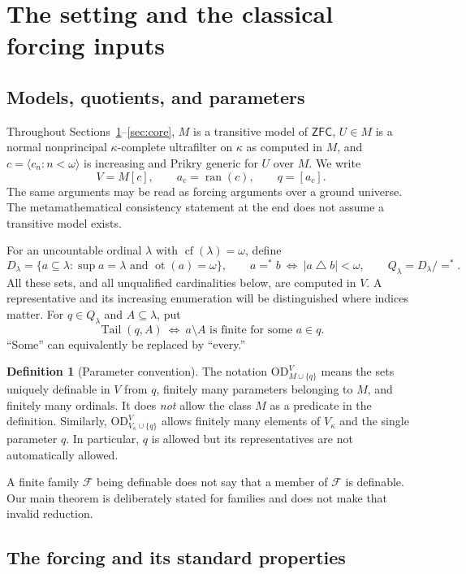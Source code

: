 \documentclass[11pt,letterpaper]{article}
\theoremstyle{definition}
\newtheorem{definition}{Definition}[section]
\numberwithin{equation}{section}
\newcommand{\ZFC}{\mathsf{ZFC}}
\newcommand{\OD}{\mathrm{OD}}
\newcommand{\cf}{\operatorname{cf}}
\newcommand{\ot}{\operatorname{ot}}
\newcommand{\ran}{\operatorname{ran}}
\newcommand{\ODg}{\OD_{M\cup\{q\}}^{V}}
\newcommand{\ODlow}{\OD_{V_\kappa\cup\{q\}}^{V}}
\newcommand{\tail}{\operatorname{Tail}}
\newcommand{\cseq}{\langle c_n:n<\omega\rangle}
\begin{document}
\section{The setting and the classical forcing inputs}\label{sec:setting}

\subsection{Models, quotients, and parameters}

Throughout Sections~\ref{sec:setting}--\ref{sec:core}, $M$ is a transitive
model of $\ZFC$, $U\in M$ is a normal nonprincipal $\kappa$-complete
ultrafilter on $\kappa$ as computed in $M$, and $c=\cseq$ is increasing and
Prikry generic for $U$ over $M$. We write
\[
 V=M[c],\qquad a_c=\ran(c),\qquad q=[a_c].
\]
The same arguments may be read as forcing arguments over a ground universe.
The metamathematical consistency statement at the end does not assume a
transitive model exists.

For an uncountable ordinal $\lambda$ with $\cf(\lambda)=\omega$, define
\[
 D_\lambda=\{a\subseteq\lambda:\sup a=\lambda\text{ and }\ot(a)=\omega\},
 \qquad
 a=^*b\ \Longleftrightarrow\ |a\mathbin\triangle b|<\omega,
 \qquad Q_\lambda=D_\lambda/=^*.
\]
All these sets, and all unqualified cardinalities below, are computed in
$V$. A representative and its increasing enumeration will be distinguished
where indices matter. For $q\in Q_\lambda$ and $A\subseteq\lambda$, put
\[
 \tail(q,A)\ \Longleftrightarrow\ a\setminus A\text{ is finite for some }a\in q.
\]
``Some'' can equivalently be replaced by ``every.''

\begin{definition}[Parameter convention]\label{def:parameters}
The notation $\ODg$ means the sets uniquely definable in $V$ from $q$,
finitely many parameters belonging to $M$, and finitely many ordinals.
It does \emph{not} allow the class $M$ as a predicate in the definition.
Similarly, $\ODlow$ allows finitely many elements of $V_\kappa$ and the
single parameter $q$. In particular, $q$ is allowed but its representatives
are not automatically allowed.
\end{definition}

A finite family $\mathcal F$ being definable does not say that a member of
$\mathcal F$ is definable. Our main theorem is deliberately stated for
families and does not make that invalid reduction.

\subsection{The forcing and its standard properties}
\end{document}
